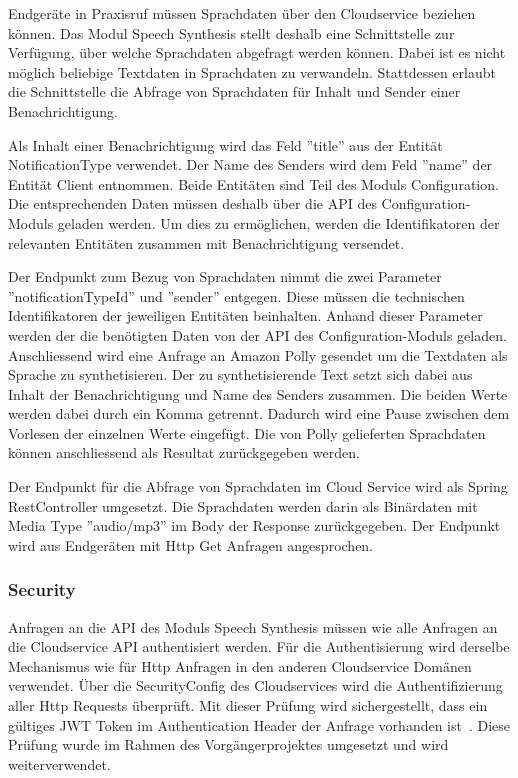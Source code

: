 Endgeräte in Praxisruf müssen Sprachdaten über den Cloudservice beziehen können.
Das Modul Speech Synthesis stellt deshalb eine Schnittstelle zur Verfügung, über welche Sprachdaten abgefragt werden können.
Dabei ist es nicht möglich beliebige Textdaten in Sprachdaten zu verwandeln.
Stattdessen erlaubt die Schnittstelle die Abfrage von Sprachdaten für Inhalt und Sender einer Benachrichtigung.

Als Inhalt einer Benachrichtigung wird das Feld ''title'' aus der Entität NotificationType verwendet.
Der Name des Senders wird dem Feld ''name'' der Entität Client entnommen.
Beide Entitäten sind Teil des Moduls Configuration.
Die entsprechenden Daten müssen deshalb über die API des Configuration-Moduls geladen werden.
Um dies zu ermöglichen, werden die Identifikatoren der relevanten Entitäten zusammen mit Benachrichtigung versendet.

Der Endpunkt zum Bezug von Sprachdaten nimmt die zwei Parameter ''notificationTypeId'' und ''sender'' entgegen.
Diese müssen die technischen Identifikatoren der jeweiligen Entitäten beinhalten.
Anhand dieser Parameter werden der die benötigten Daten von der API des Configuration-Moduls geladen.
Anschliessend wird eine Anfrage an Amazon Polly gesendet um die Textdaten als Sprache zu synthetisieren.
Der zu synthetisierende Text setzt sich dabei aus Inhalt der Benachrichtigung und Name des Senders zusammen.
Die beiden Werte werden dabei durch ein Komma getrennt.
Dadurch wird eine Pause zwischen dem Vorlesen der einzelnen Werte eingefügt.
Die von Polly gelieferten Sprachdaten können anschliessend als Resultat zurückgegeben werden.

Der Endpunkt für die Abfrage von Sprachdaten im Cloud Service wird als Spring RestController umgesetzt.
Die Sprachdaten werden darin als Binärdaten mit Media Type ''audio/mp3'' im Body der Response zurückgegeben.
Der Endpunkt wird aus Endgeräten mit Http Get Anfragen angesprochen.

\subsubsection{Security}

Anfragen an die API des Moduls Speech Synthesis müssen wie alle Anfragen an die Cloudservice API authentisiert werden.
Für die Authentisierung wird derselbe Mechanismus wie für Http Anfragen in den anderen Cloudservice Domänen verwendet.
Über die SecurityConfig des Cloudservices wird die Authentifizierung aller Http Requests überprüft.
Mit dieser Prüfung wird sichergestellt, dass ein gültiges JWT Token im Authentication Header der Anfrage vorhanden ist~\cite{ip5}.
Diese Prüfung wurde im Rahmen des Vorgängerprojektes umgesetzt und wird weiterverwendet.

